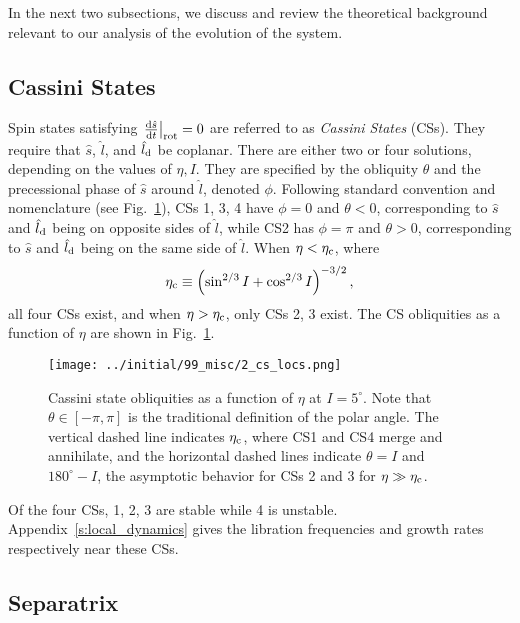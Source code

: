 \documentclass[
        fleqn,
        usenatbib,
        referee,
    ]{mnras}
\newcommand*{\rd}[2]{\frac{\mathrm{d}#1}{\mathrm{d}#2}}
\newcommand*{\at}[1]{\left.#1\right|}
\newcommand*{\p}[1]{\left(#1\right)}
\begin{document}
In the next two subsections, we discuss and review the theoretical background
relevant to our analysis of the evolution of the system.

\subsection{Cassini States}\label{ss:cs}

Spin states satisfying $\at{\rd{\hat{s}}{t}}_{\rm rot} = 0$ are referred to as
\emph{Cassini States} (CSs). They require that $\hat{s}$, $\hat{l}$, and
$\hat{l}_{\rm d}$ be coplanar. There are either two or four solutions, depending
on the values of $\eta, I$. They are specified by the obliquity $\theta$ and the
precessional phase of $\hat{s}$ around $\hat{l}$, denoted $\phi$. Following
standard convention and nomenclature (see Fig.~\ref{fig:cs_locs}), CSs 1, 3, 4
have $\phi = 0$ and $\theta < 0$, corresponding to $\hat{s}$ and $\hat{l}_{\rm
d}$ being on opposite sides of $\hat{l}$, while CS2 has $\phi = \pi$ and $\theta
> 0$, corresponding to $\hat{s}$ and $\hat{l}_{\rm d}$ being on the same side of
$\hat{l}$. When $\eta < \eta_{\rm c}$, where
\begin{equation}
    \eta_{\rm c} \equiv \p{\sin^{2/3}I + \cos^{2/3}I}^{-3/2},
\end{equation}
all four CSs exist, and when $\eta > \eta_{\rm c}$, only CSs 2, 3 exist. The CS
obliquities as a function of $\eta$ are shown in Fig.~\ref{fig:cs_locs}.
\begin{figure}
    \centering
    \texttt{[image: ../initial/99\_misc/2\_cs\_locs.png]}
    \caption{Cassini state obliquities as a function of $\eta$ at $I = 5^\circ$.
    Note that $\theta \in [-\pi, \pi]$ is the traditional definition of the
    polar angle. The vertical dashed line indicates $\eta_{\rm c}$, where CS1
    and CS4 merge and annihilate, and the horizontal dashed lines indicate
    $\theta = I$ and $180^\circ - I$, the asymptotic behavior for CSs 2 and 3
    for $\eta \gg \eta_{\rm c}$.}\label{fig:cs_locs}
\end{figure}

Of the four CSs, 1, 2, 3 are stable while 4 is unstable.
Appendix~\ref{s:local_dynamics} gives the libration frequencies and growth rates
respectively near these CSs.

\subsection{Separatrix}
\end{document}
